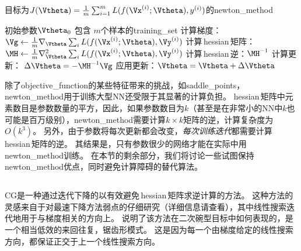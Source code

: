 \begin{algorithm}[ht]
\caption{目标为$J(\Vtheta)= \frac{1}{m} \sum_{i=1}^m L(f(\Vx^{(i)};\Vtheta), y^{(i)})$的\gls{newton_method}}
\label{alg:newton}
\begin{algorithmic}
\REQUIRE 初始参数$\Vtheta_{0}$
\REQUIRE 包含 $m$个样本的\gls{training_set}
      \STATE 计算梯度： $\Vg \leftarrow 
     \frac{1}{m} \nabla_{\Vtheta} \sum_i L(f(\Vx^{(i)};\Vtheta),\Vy^{(i)})$ 
      \STATE 计算\,\gls{hessian}\,矩阵：$\MH \leftarrow  
     \frac{1}{m} \nabla_{\Vtheta}^2 \sum_i L(f(\Vx^{(i)};\Vtheta),\Vy^{(i)})$ 
    \STATE 计算\,\gls{hessian}\,逆：$\MH^{-1}$
    \STATE 计算更新： $\Delta \Vtheta = - \MH^{-1} \Vg$
    \STATE 应用更新：$\Vtheta = \Vtheta+\Delta \Vtheta$
\ENDWHILE
\end{algorithmic}
\end{algorithm}


除了\gls{objective_function}的某些特征带来的挑战，如\gls{saddle_points}，\gls{newton_method}用于训练大型\gls{NN}还受限于其显著的计算负担。
\gls{hessian}\,矩阵中元素数目是参数数量的平方，因此，如果参数数目为$k$（甚至是在非常小的\gls{NN}中$k$也可能是百万级别），\gls{newton_method}需要计算$k\times k$矩阵的逆，计算复杂度为$O(k^3)$。
另外，由于参数将每次更新都会改变，\emph{每次训练迭代}都需要计算\,\gls{hessian}\,矩阵的逆。
其结果是，只有参数很少的网络才能在实际中用\gls{newton_method}训练。
在本节的剩余部分，我们将讨论一些试图保持\gls{newton_method}优点，同时避免计算障碍的替代算法。

\subsection{}
\label{sec:conjugate_gradients}
\gls{CG}是一种通过迭代下降的以有效避免\,\gls{hessian}\,矩阵求逆计算的方法。
这种方法的灵感来自于对最速下降方法弱点的仔细研究（详细信息请查看），其中线性搜索迭代地用于与梯度相关的方向上。
说明了该方法在二次碗型目标中如何表现的，是一个相当低效的来回往复，锯齿形模式。
这是因为每一个由梯度给定的线性搜索方向，都保证正交于上一个线性搜索方向。

